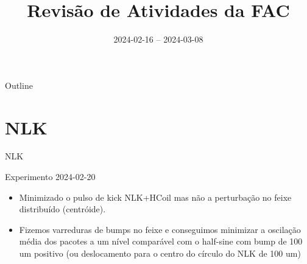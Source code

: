 \documentclass{beamer}					  %
\title{Revisão de Atividades da FAC}	%
\institute{LNLS.DAC.FAC}				%
\date{2024-02-16 -- 2024-03-08}			%
\begin{document}
\begin{frame}
  \titlepage
  \href{https://github.com/lnls-fac/doc-review-dac-fac}{}
  \href{https://www.overleaf.com/read/sbdjxtzfchrm}{}
\end{frame}

\begin{frame}{Outline}
  \tableofcontents
\end{frame}








\section{NLK}

\begin{frame}{NLK}
    \vspace{0.2 cm}
    \large{
    Experimento 2024-02-20
    \vspace{0.4 cm}
    \begin{itemize}
            \item Minimizado o pulso de kick NLK+HCoil mas não a perturbação no feixe distribuído (centróide). \vspace{0.4 cm}
            \item Fizemos varreduras de bumps no feixe e conseguimos minimizar a oscilação média dos pacotes a um nível comparável com o half-sine com bump de 100 um positivo (ou deslocamento para o centro do círculo do NLK de 100 um)
    \end{itemize}
    }
\end{frame}
\end{document}
